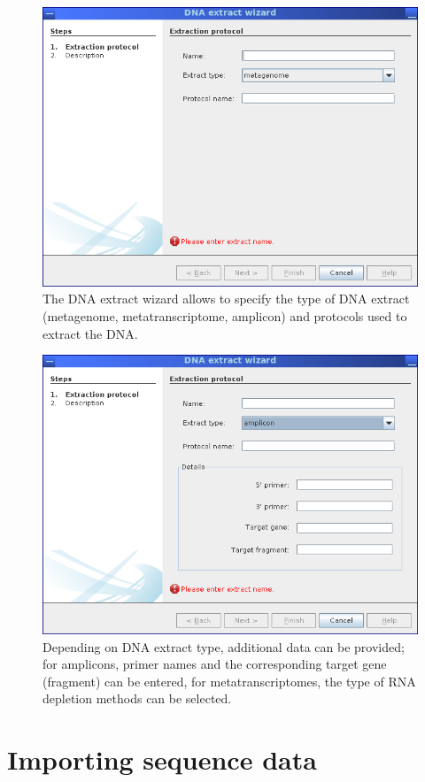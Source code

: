 \begin{figure}[H]
\centering
\includegraphics[width=.8\textwidth]{img/mgx/extractwiz1}
\caption[DNA extract wizard]{The DNA extract wizard allows to specify the type of DNA extract (metagenome, 
metatranscriptome, amplicon) and protocols used to extract the DNA.}
\label{extractwiz1}
\end{figure}

\begin{figure}[H]
\centering
\includegraphics[width=.8\textwidth]{img/mgx/extractwiz2}
\caption[DNA extract wizard]{Depending on DNA extract type, additional data can be provided; for amplicons, primer
names and the corresponding target gene (fragment) can be entered, for metatranscriptomes, the type of RNA depletion
methods can be selected.}
\label{extractwiz2}
\end{figure}

\section{Importing sequence data}

